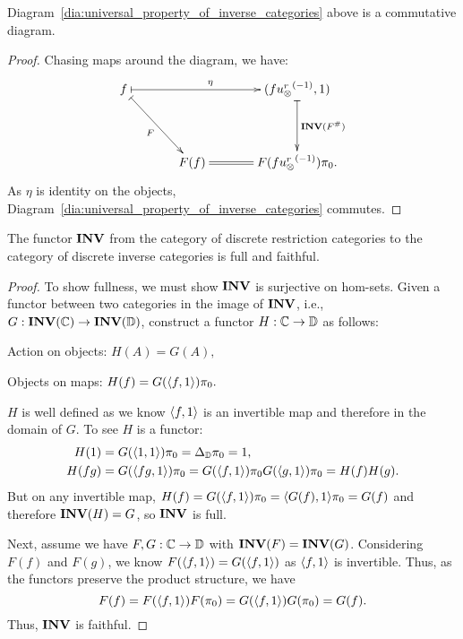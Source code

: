 \begin{lemma}\label{lem:universal_diagram_is_a_commutative_diagram}
  Diagram~\ref{dia:universal_property_of_inverse_categories} above is a commutative diagram.

\end{lemma}
\begin{proof}
  Chasing maps around the diagram, we have:
  \[
    \xymatrix @C=35pt @R=40pt{
      f \ar@{|->}[rr]^{\eta} \ar@{|->}[rd]_{F}&& (f\inv{\usr},1) \ar@{|->}[d]^{\Inv{F^{\#}}}\\
      &F(f) \ar@{=}[r] & F(f\inv{\usr})\pi_0.
    }
  \]
  As $\eta$ is identity on the objects, Diagram~\ref{dia:universal_property_of_inverse_categories}
  commutes.
\end{proof}

\begin{lemma}\label{lem:inv_is_full_and_faithful}
  The functor $\mathbf{INV}$ from the category of discrete restriction categories to the category of
  discrete inverse categories is full and faithful.
\end{lemma}
\begin{proof}
  To show fullness, we must show $\mathbf{INV}$ is surjective on hom-sets. Given a functor between two
  categories in the image of $\mathbf{INV}$, i.e., $G:\mathbf{INV}({\mathbb{C}})\to \mathbf{INV}({\mathbb{D}})$, construct a functor
  $H:\mathbb{C}\to\mathbb{D}$ as follows:
  \begin{description}
    \item{Action on objects:} $H(A) = G(A),$
    \item{Objects on maps:} $H(f) = G(\langle f,1\rangle)\pi_0.$
  \end{description}
  $H$ is well defined as we know $\langle f,1\rangle$ is an invertible map and therefore in the domain of $G$.
  To see $H$ is a functor:
  \begin{align*}
    H(1) &= G(\langle1,1\rangle)\pi_0 = \Delta_{\mathbb{D}}\pi_0 = 1,\\
    H(f g) &= G(\langle f g,1\rangle)\pi_0 = G(\langle f,1\rangle)\pi_0G(\langle g,1\rangle)\pi_0 = H(f)H(g).
  \end{align*}
  But on any invertible map, $H(f) = G(\langle f,1\rangle)\pi_0 = \langle G(f),1\rangle\pi_0 = G(f)$ and therefore
  $\mathbf{INV}({H}) = G$, so $\mathbf{INV}$ is full.

  Next, assume we have $F,G:\mathbb{C}\to\mathbb{D}$ with $\mathbf{INV}({F}) = \mathbf{INV}({G})$. Considering $F(f)$ and $F(g)$, we
  know $F(\langle f,1\rangle) = G(\langle f,1\rangle) $ as $\langle f,1\rangle$ is invertible. Thus, as the functors preserve the
  product structure, we have
  \[
    F(f) = F(\langle f,1\rangle)F(\pi_0)= G(\langle f,1\rangle)G(\pi_0)= G(f).
  \]
  Thus, $\mathbf{INV}$ is faithful.
\end{proof}

